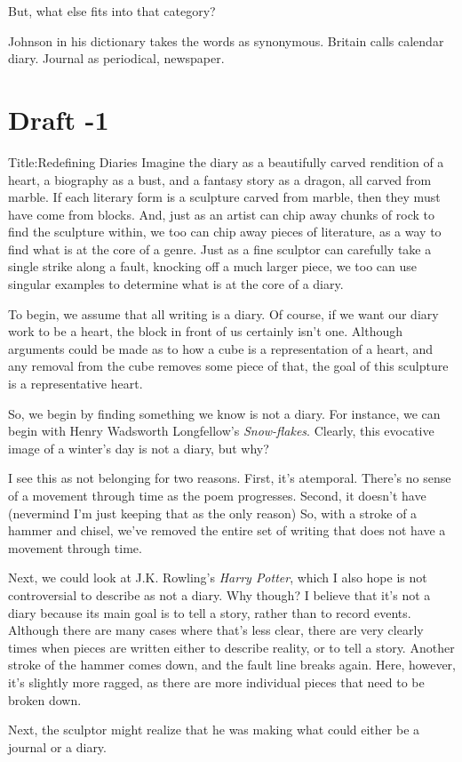 \documentclass[12pt]{article}[titlepage]
\newcommand{\1}{\={a}}
\newcommand{\2}{\={e}}
\newcommand{\3}{\={\i}}
\newcommand{\4}{\=o}
\newcommand{\5}{\=u}
\newcommand{\6}{\={A}}
\renewcommand{\,}{\textsuperscript{,}}
\begin{document}
But, what else fits into that category?

Johnson in his dictionary takes the words as synonymous.
Britain calls calendar diary.
Journal as periodical, newspaper.

\section{Draft -1}
Title:Redefining Diaries
Imagine the diary as a beautifully carved rendition of a heart, a biography as a bust, and a fantasy story as a dragon, all carved from marble.
If each literary form is a sculpture carved from marble, then they must have come from blocks.
And, just as an artist can chip away chunks of rock to find the sculpture within, we too can chip away pieces of literature, as a way to find what is at the core of a genre.
Just as a fine sculptor can carefully take a single strike along a fault, knocking off a much larger piece, we too can use singular examples to determine what is at the core of a diary.

To begin, we assume that all writing is a diary.
Of course, if we want our diary work to be a heart, the block in front of us certainly isn't one.
Although arguments could be made as to how a cube is a representation of a heart, and any removal from the cube removes some piece of that, the goal of this sculpture is a representative heart.

So, we begin by finding something we know is not a diary.
For instance, we can begin with Henry Wadsworth Longfellow's \textit{Snow-flakes}.
Clearly, this evocative image of a winter's day is not a diary, but why?

I see this as not belonging for two reasons.
First, it's atemporal.
There's no sense of a movement through time as the poem progresses.
Second, it doesn't have (nevermind I'm just keeping that as the only reason)
So, with a stroke of a hammer and chisel, we've removed the entire set of writing that does not have a movement through time.

Next, we could look at J.K. Rowling's \textit{Harry Potter}, which I also hope is not controversial to describe as not a diary.
Why though?
I believe that it's not a diary because its main goal is to tell a story, rather than to record events.
Although there are many cases where that's less clear, there are very clearly times when pieces are written either to describe reality, or to tell a story.
Another stroke of the hammer comes down, and the fault line breaks again.
Here, however, it's slightly more ragged, as there are more individual pieces that need to be broken down.

Next, the sculptor might realize that he was making what could either be a journal or a diary.
\end{document}
